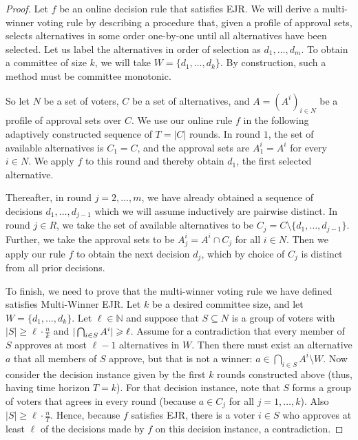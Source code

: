\documentclass[10pt]{scrartcl}
\theoremstyle{plain}
\theoremstyle{definition}
\renewcommand*{\ge}{\geqslant}
\renewcommand*{\geq}{\geqslant}
\begin{document}
\begin{proof}
Let $f$ be an online decision rule that satisfies EJR. We will derive a multi-winner voting rule by describing a procedure that, given a profile of approval sets, selects alternatives in some order one-by-one until all alternatives have been selected. Let us label the alternatives in order of selection as $d_1, \dots, d_m$. To obtain a committee of size $k$, we will take $W = \{d_1, \dots, d_k\}$. By construction, such a method must be committee monotonic.

So let $N$ be a set of voters, $C$ be a set of alternatives, and $A = (A^i)_{i \in N}$ be a profile of approval sets over $C$.
We use our online rule $f$ in the following adaptively constructed sequence of $T = |C|$ rounds.
In round $1$, the set of available alternatives is $C_1 = C$, and the approval sets are $A_1^i = A^i$ for every $i \in N$. We apply $f$ to this round and thereby obtain $d_1$, the first selected alternative.

Thereafter, in round $j = 2, \dots, m$, we have already obtained a sequence of decisions $d_1, \dots, d_{j-1}$ which we will assume inductively are pairwise distinct. In round $j \in R$, we take the set of available alternatives to be $C_j = C \setminus \{d_1, \dots, d_{j-1}\}$. Further, we take the approval sets to be $A_j^i = A^i \cap C_j$ for all $i \in N$. Then we apply our rule $f$ to obtain the next decision $d_j$, which by choice of $C_j$ is distinct from all prior decisions.

To finish, we need to prove that the multi-winner voting rule we have defined satisfies Multi-Winner EJR. Let $k$ be a desired committee size, and let $W = \{d_1, \dots, d_k\}$. Let $\ell \in \mathbb N$ and suppose that $S\subseteq N$ is a group of voters with $|S| \geq \ell \cdot \frac{n}{k}$ and $\smash{|\bigcap_{i\in S} A^i|} \ge \ell$. Assume for a contradiction that every member of $S$ approves at most $\ell - 1$ alternatives in $W$. Then there must exist an alternative $a$ that all members of $S$ approve, but that is not a winner: $a \in \bigcap_{i\in S} A^i \setminus W$. Now consider the decision instance given by the first $k$ rounds constructed above (thus, having time horizon $T = k$). For that decision instance, note that $S$ forms a group of voters that agrees in every round (because $a \in C_j$ for all $j = 1, \dots, k$). Also $|S| \ge \ell \cdot \frac{n}{T}$. Hence, because $f$ satisfies EJR, there is a voter $i \in S$ who approves at least $\ell$ of the decisions made by $f$ on this decision instance, a contradiction.
\end{proof} 
\end{document}
